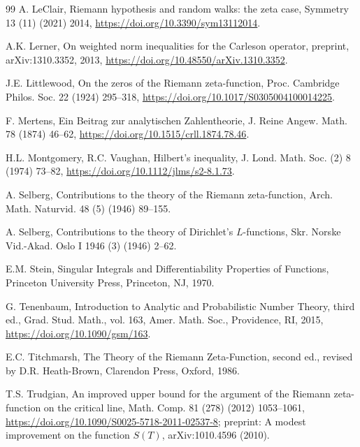 \documentclass[preprint,12pt]{elsarticle}
\numberwithin{equation}{section}
\theoremstyle{plain}
\theoremstyle{definition}
\theoremstyle{remark}
\begin{document}
\begin{thebibliography}{99}
A. LeClair, Riemann hypothesis and random walks: the zeta case, Symmetry 13 (11) (2021) 2014, \href{https://doi.org/10.3390/sym13112014}{https://doi.org/10.3390/sym13112014}.

A.K. Lerner, On weighted norm inequalities for the Carleson operator, preprint, arXiv:1310.3352, 2013, \href{https://doi.org/10.48550/arXiv.1310.3352}{https://doi.org/10.48550/arXiv.1310.3352}.

J.E. Littlewood, On the zeros of the Riemann zeta-function, Proc. Cambridge Philos. Soc. 22 (1924) 295--318, \href{https://doi.org/10.1017/S0305004100014225}{https://doi.org/10.1017/S0305004100014225}.

F. Mertens, Ein Beitrag zur analytischen Zahlentheorie, J. Reine Angew. Math. 78 (1874) 46--62, \href{https://doi.org/10.1515/crll.1874.78.46}{https://doi.org/10.1515/crll.1874.78.46}.

H.L. Montgomery, R.C. Vaughan, Hilbert's inequality, J. Lond. Math. Soc. (2) 8 (1974) 73--82, \href{https://doi.org/10.1112/jlms/s2-8.1.73}{https://doi.org/10.1112/jlms/s2-8.1.73}.

A. Selberg, Contributions to the theory of the Riemann zeta-function, Arch. Math. Naturvid. 48 (5) (1946) 89--155.

A. Selberg, Contributions to the theory of Dirichlet's $L$-functions, Skr. Norske Vid.-Akad. Oslo I 1946 (3) (1946) 2--62.

E.M. Stein, Singular Integrals and Differentiability Properties of Functions, Princeton University Press, Princeton, NJ, 1970.

G. Tenenbaum, Introduction to Analytic and Probabilistic Number Theory, third ed., Grad. Stud. Math., vol. 163, Amer. Math. Soc., Providence, RI, 2015, \href{https://doi.org/10.1090/gsm/163}{https://doi.org/10.1090/gsm/163}.

E.C. Titchmarsh, The Theory of the Riemann Zeta-Function, second ed., revised by D.R. Heath-Brown, Clarendon Press, Oxford, 1986.

T.S. Trudgian, An improved upper bound for the argument of the Riemann zeta-function on the critical line, Math. Comp. 81 (278) (2012) 1053--1061, \href{https://doi.org/10.1090/S0025-5718-2011-02537-8}{https://doi.org/10.1090/S0025-5718-2011-02537-8}; preprint: A modest improvement on the function $S(T)$, arXiv:1010.4596 (2010).


\end{thebibliography}
\end{document}

